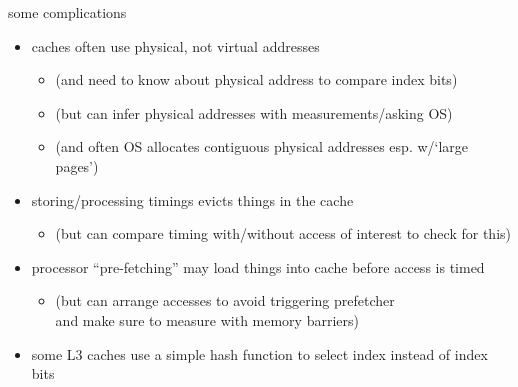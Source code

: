 \begin{frame}{some complications}
    \begin{itemize}
    \item caches often use physical, not virtual addresses
        \begin{itemize}
        \item (and need to know about physical address to compare index bits)
        \item (but can infer physical addresses with measurements/asking OS)
        \item (and often OS allocates contiguous physical addresses esp. w/`large pages')
        \end{itemize}
    \item storing/processing timings evicts things in the cache
        \begin{itemize}
        \item (but can compare timing with/without access of interest to check for this)
        \end{itemize}
    \item processor ``pre-fetching'' may load things into cache before access is timed
        \begin{itemize}
            \item (but can arrange accesses to avoid triggering prefetcher \\
                and make sure to measure with memory barriers)
        \end{itemize}
    \item some L3 caches use a simple hash function to select index instead of  index bits
    \end{itemize}
\end{frame}

